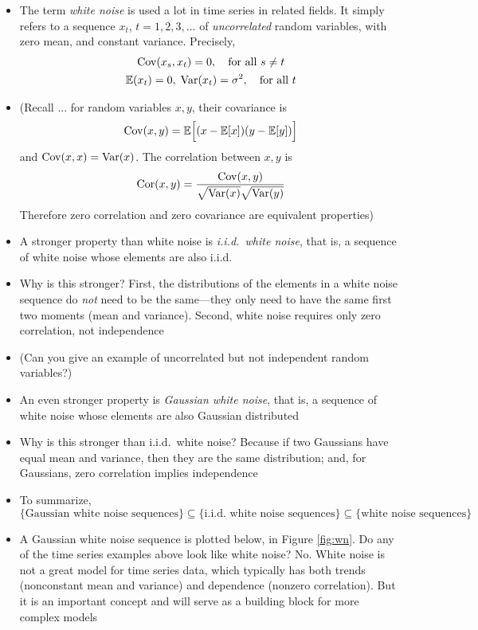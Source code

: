 \documentclass{article}
\begin{document}
\begin{itemize}
\item The term \emph{white noise} is used a lot in time series in related
  fields. It simply refers to a sequence $x_t$, $t = 1,2,3,\dots$ of
  \emph{uncorrelated} random variables, with zero mean, and constant
  variance. Precisely, 
  \begin{gather*}
  \operatorname{Cov}(x_s, x_t) = 0, \quad \text{for all $s \not= t$} \\
  \mathbb{E}(x_t) = 0, \; \operatorname{Var}(x_t) = \sigma^2, \quad \text{for all $t$} 
  \end{gather*}

\item (Recall ... for random variables $x,y$, their covariance is 
  \[
  \operatorname{Cov}(x, y) = \mathbb{E}\Big[ (x - \mathbb{E}[x]) (y - \mathbb{E}[y]) \Big]
  \]
  and $\operatorname{Cov}(x, x) = \operatorname{Var}(x)$. The correlation between $x,y$ is
  \[
  \operatorname{Cor}(x, y) = \frac{\operatorname{Cov}(x, y)}{\sqrt{\operatorname{Var}(x)} \sqrt{\operatorname{Var}(y)}}
  \]
  Therefore zero correlation and zero covariance are equivalent properties)

\item A stronger property than white noise is \emph{i.i.d.\ white noise}, that
  is, a sequence of white noise whose elements are also i.i.d.

\item Why is this stronger? First, the distributions of the elements in a white
  noise sequence do \emph{not} need to be the same---they only need to have the
  same first two moments (mean and variance). Second, white noise requires only
  zero correlation, not independence 

\item (Can you give an example of uncorrelated but not independent random
  variables?) 

\item An even stronger property is \emph{Gaussian white noise}, that is, a
  sequence of white noise whose elements are also Gaussian distributed

\item Why is this stronger than i.i.d.\ white noise? Because if two Gaussians
  have equal mean and variance, then they are the same distribution; and, for
  Gaussians, zero correlation implies independence

\item To summarize, 
  \[
  \{ \text{Gaussian white noise sequences} \} \subseteq
  \{ \text{i.i.d.\ white noise sequences} \} \subseteq
  \{ \text{white noise sequences} \} 
  \]

\item A Gaussian white noise sequence is plotted below, in Figure
  \ref{fig:wn}. Do any of the time series examples above look like white noise?
  No. White noise is not a great model for time series data, which typically has
  both trends (nonconstant mean and variance) and dependence (nonzero
  correlation). But it is an important concept and will serve as a building
  block for more complex models  
\end{itemize}
\end{document}
